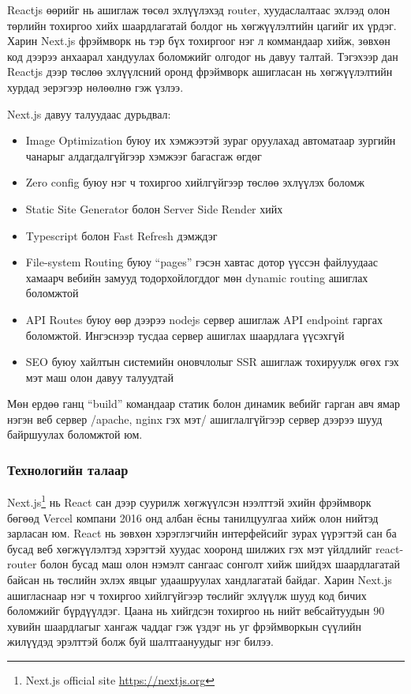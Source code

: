 Reactjs өөрийг нь ашиглаж төсөл эхлүүлэхэд router, хуудаслалтаас эхлээд олон төрлийн тохиргоо хийх шаардлагатай болдог нь хөгжүүлэлтийн цагийг их үрдэг. Харин Next.js фрэймворк нь тэр бүх тохиргоог нэг л коммандаар хийж, зөвхөн код дээрээ анхаарал хандуулах боломжийг олгодог нь давуу талтай. Тэгэхээр дан Reactjs дээр төслөө эхлүүлсний оронд фрэймворк ашигласан нь хөгжүүлэлтийн хурдад эерэгээр нөлөөлнө гэж үзлээ. 

Next.js давуу талуудаас дурьдвал:
\begin{itemize}
	\item Image Optimization буюу их хэмжээтэй зураг оруулахад автоматаар зургийн чанарыг алдагдалгүйгээр хэмжээг багасгаж өгдөг
	\item Zero config буюу нэг ч тохиргоо хийлгүйгээр төслөө эхлүүлэх боломж
	\item Static Site Generator болон Server Side Render хийх
	\item Typescript болон Fast Refresh дэмждэг
	\item File-system Routing буюу “pages” гэсэн хавтас дотор үүссэн файлуудаас хамаарч вебийн замууд тодорхойлогддог мөн dynamic routing ашиглах боломжтой
	\item API Routes буюу өөр дээрээ nodejs сервер ашиглаж API endpoint гаргах боломжтой. Ингэснээр тусдаа сервер ашиглах шаардлага үүсэхгүй
	\item SEO буюу хайлтын системийн оновчлолыг SSR ашиглаж тохируулж өгөх гэх мэт маш олон давуу талуудтай
\end{itemize}

Мөн ердөө ганц “build” командаар статик болон динамик вебийг гарган авч ямар нэгэн веб сервер /apache, nginx гэх мэт/ ашиглалгүйгээр сервер дээрээ шууд байршуулах боломжтой юм.

\subsubsection{Технологийн талаар}

Next.js\footnote{Next.js official site \url{https://nextjs.org}} нь React сан дээр суурилж хөгжүүлсэн нээлттэй эхийн фрэймворк бөгөөд Vercel компани 2016 онд албан ёсны танилцуулгаа хийж олон нийтэд зарласан юм. React нь зөвхөн хэрэглэгчийн интерфейсийг зурах үүрэгтэй сан ба бусад веб хөгжүүлэлтэд хэрэгтэй хуудас хооронд шилжих гэх мэт үйлдлийг react-router болон бусад маш олон нэмэлт сангаас сонголт хийж шийдэх шаардлагатай байсан нь төслийн эхлэх явцыг удаашруулах хандлагатай байдаг. Харин Next.js ашигласнаар нэг ч тохиргоо хийлгүйгээр төслийг эхлүүлж шууд код бичих боломжийг бүрдүүлдэг. Цаана нь хийгдсэн тохиргоо нь нийт вебсайтуудын 90 хувийн шаардлагыг хангаж чаддаг гэж үздэг нь уг фрэймворкын сүүлийн жилүүдэд эрэлттэй болж буй шалтгаануудыг нэг билээ.



